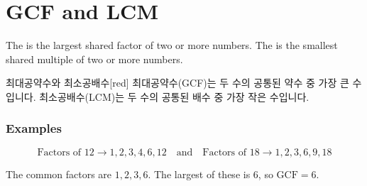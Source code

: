 \documentclass[12pt]{book}
\begin{document}





  \twosidedpaper
  \section{GCF and LCM}

  The  is the largest shared factor of two or more numbers.  
  The  is the smallest shared multiple of two or more numbers.  


  \begin{flexbox}{최대공약수와 최소공배수}[red]
  최대공약수(GCF)는 두 수의 공통된 약수 중 가장 큰 수입니다.  
  최소공배수(LCM)는 두 수의 공통된 배수 중 가장 작은 수입니다.  
  \end{flexbox}

  \subsubsection*{Examples}

  \[
  \text{Factors of } 12 \rightarrow 1,2,3,4,6,12 \quad\text{and}\quad
  \text{Factors of } 18 \rightarrow 1,2,3,6,9,18
  \]

  The common factors are $1,2,3,6$.  
  The largest of these is $6$, so $\mathrm{GCF}=6$.
\end{document}
